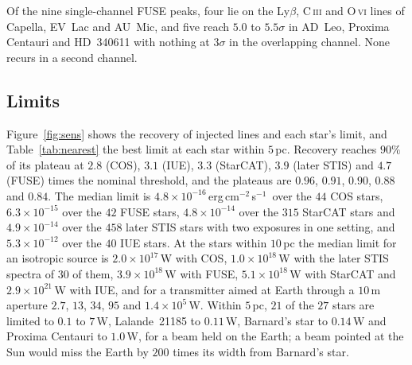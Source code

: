 \documentclass[3p,11pt]{elsarticle}
\newcommand{\flux}{erg\,cm$^{-2}$\,s$^{-1}$}
\newcommand{\sci}[2]{#1\times10^{#2}}
\newcommand{\ion}[2]{#1\,\textsc{#2}}
\begin{document}
Of the nine single-channel FUSE peaks, four lie on the Ly$\beta$, \ion{C}{iii}
and \ion{O}{vi} lines of Capella, EV~Lac and AU~Mic, and five reach $5.0$ to $5.5\sigma$
in AD~Leo, Proxima Centauri and HD~340611 with nothing at $3\sigma$ in the overlapping
channel. None recurs in a second channel.

\subsection{Limits}\label{sec:limits}

Figure~\ref{fig:sens} shows the recovery of injected lines and each star's limit, and
Table~\ref{tab:nearest} the best limit at each star within $5$\,pc. Recovery reaches
$90\%$ of its plateau at $2.8$ (COS), $3.1$ (IUE), $3.3$ (StarCAT), $3.9$ (later STIS)
and $4.7$ (FUSE) times the nominal threshold, and the plateaus are $0.96$, $0.91$,
$0.90$, $0.88$ and $0.84$. The median limit is $\sci{4.8}{-16}$\,\flux\ over the $44$
COS stars, $\sci{6.3}{-15}$ over the $42$ FUSE stars, $\sci{4.8}{-14}$ over the $315$
StarCAT stars and $\sci{4.9}{-14}$ over the $458$ later STIS stars with two exposures in
one setting, and $\sci{5.3}{-12}$ over the $40$ IUE stars. At the stars within $10$\,pc
the median limit for an isotropic source is $\sci{2.0}{17}$\,W with COS,
$\sci{1.0}{18}$\,W with the later STIS spectra of $30$ of them, $\sci{3.9}{18}$\,W with
FUSE, $\sci{5.1}{18}$\,W with StarCAT and $\sci{2.9}{21}$\,W with IUE, and for a
transmitter aimed at Earth through a $10$\,m aperture $2.7$, $13$, $34$, $95$ and
$\sci{1.4}{5}$\,W. Within $5$\,pc, $21$ of the $27$ stars are limited to $0.1$ to
$7$\,W, Lalande~21185 to $0.11$\,W, Barnard's star to $0.14$\,W and Proxima Centauri to
$1.0$\,W, for a beam held on the Earth; a beam pointed at the Sun would miss the Earth
by $200$ times its width from Barnard's star.
\end{document}
